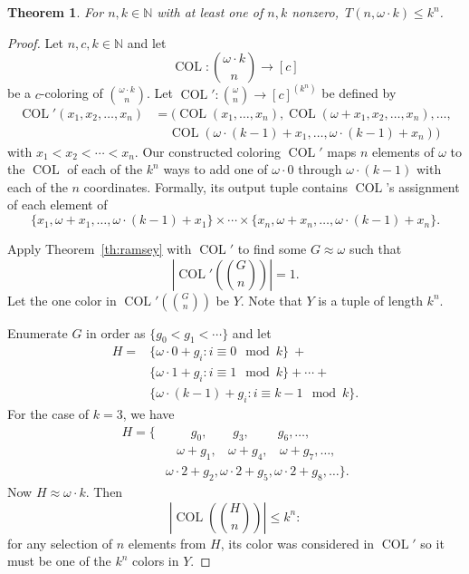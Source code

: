 \documentclass[10pt,a4paper]{article}
\newcommand{\om}{\omega}
\newcommand{\oequiv}{\approx}
\newcommand{\setconcat}{+}
\newcommand{\COL}{\operatorname{COL}}
\newcommand{\N}{\mathbb{N}}
\newcommand{\numpoints}{n}
\newcommand{\numcolors}{c}
\theoremstyle{plain}
\newtheorem{theorem}{Theorem}[section]
\theoremstyle{definition}
\begin{document}
\begin{theorem}\label{th:omka-lt}
For $\numpoints,k \in \N$ with at least one of $\numpoints,k$ nonzero,~$T(\numpoints,\om \cdot k) \leq k^{\numpoints}$.
\end{theorem}
\begin{proof}
Let $\numpoints,\numcolors, k  \in \N$ and let 
$$\COL \colon \binom{\om \cdot k}{\numpoints} \to [\numcolors]$$
be a $\numcolors$-coloring of $\binom{\om \cdot k}{\numpoints}$.
Let $\COL' \colon \binom{\om}{\numpoints} \to [\numcolors]^{(k^{\numpoints})}$ 
be defined by
\begin{align*}\COL'(x_1,x_2,\ldots,x_{\numpoints}) & = (\COL(x_1,\ldots,x_{\numpoints}), \COL(\om + x_1,x_2,\ldots,x_{\numpoints}), \ldots, \\&~~~~~\COL(\om \cdot (k-1) + x_1, \ldots, \om \cdot (k-1) + x_{\numpoints}))\end{align*}
with $x_1 < x_2 < \cdots < x_{\numpoints}.$ Our constructed coloring 
$\COL'$ maps $\numpoints$ elements of $\om$ to the $\COL$ of each of the $k^{\numpoints}$ ways to add one of $\om\cdot 0$ through $\om \cdot (k-1)$ with each of the $\numpoints$ coordinates. 
Formally, its output tuple contains $\COL$'s assignment of each element of $$
\{x_1,\om+x_1,\ldots,\om\cdot(k-1)+x_1\}\times\cdots\times
\{x_{\numpoints},\om+x_\numpoints,\ldots,\om\cdot(k-1)+x_\numpoints\}.
$$

Apply Theorem~\ref{th:ramsey} with $\COL'$ to find some $G\oequiv \om$ such that 
$$
\left |\COL'\left(\binom{G}{\numpoints}\right)\right|=1.
$$ 
Let the one color in $\COL'\left(\binom{G}{\numpoints}\right)$ be $Y$. 
Note that $Y$ is a tuple of length $k^{\numpoints}$. 

Enumerate $G$ in order as $\{g_0 < g_1 < \cdots\}$ and let \begin{align*}
H = & \{\om \cdot 0 + g_i \colon i \equiv 0 \mod k\}~\!\setconcat\\
 & \{\om \cdot 1 + g_i \colon i\equiv 1 \mod k \} \setconcat \cdots \setconcat  \\
& \{\om \cdot (k-1) + g_i \colon i \equiv k-1 \mod k\}.
\end{align*} For the case of $k=3$, we have \begin{align*}
    H = \{ & ~~~~~~~~~g_0, ~~~~~~~~~g_3, ~~~~~~~~~~g_6, \ldots,\\
    & ~~~~\!\om + g_1, ~~~~\!\om + g_4, ~~~~\om + g_7, \ldots,\\
    & \om \cdot 2 + g_2, \om \cdot 2 + g_5, \om \cdot 2 + g_8,\ldots\}.
\end{align*} Now $H \oequiv \om \cdot k$. Then
$$
\left |\COL\left(\binom{H}{\numpoints}\right)\right |\leq k^{\numpoints}:
$$ 
for any selection of $\numpoints$ elements from $H$, its color was considered in $\COL'$ so it must be one of the $k^{\numpoints}$ colors in $Y$.
\end{proof}
\end{document}
